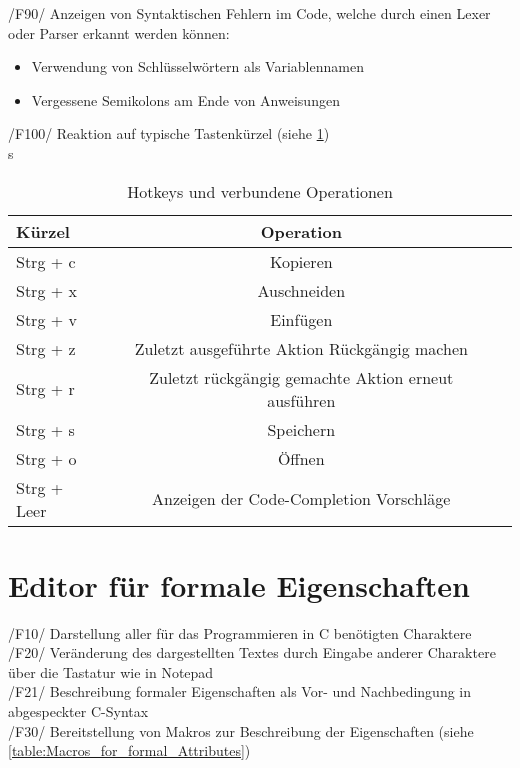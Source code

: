 \documentclass[a4paper]{scrreprt}
\begin{document}
/F90/ Anzeigen von Syntaktischen Fehlern im Code, welche durch einen Lexer oder Parser erkannt werden können: 
\begin{itemize}
\item Verwendung von Schlüsselwörtern als Variablennamen 
\item Vergessene Semikolons am Ende von Anweisungen
\end{itemize}
/F100/ Reaktion auf typische Tastenkürzel (siehe \ref{table:Hotkeys_and_operations})\\s
\begin{table}
\caption{Hotkeys und verbundene Operationen}
\begin{tabular}{lcr} 
Kürzel & Operation \\
\hline 
Strg + c & Kopieren \\
Strg + x & Auschneiden \\
Strg + v & Einfügen \\
Strg + z & Zuletzt ausgeführte Aktion Rückgängig machen \\
Strg + r & Zuletzt rückgängig gemachte Aktion erneut ausführen \\
Strg + s & Speichern \\
Strg + o & Öffnen \\
Strg + Leer & Anzeigen der Code-Completion Vorschläge\\
\end{tabular}
\label{table:Hotkeys_and_operations}
\end{table}

 
\section{Editor für formale Eigenschaften}
/F10/ Darstellung aller für das Programmieren in C benötigten Charaktere \\
/F20/ Veränderung des dargestellten Textes durch Eingabe anderer Charaktere über die  Tastatur wie in Notepad \\
/F21/ Beschreibung formaler Eigenschaften als Vor- und Nachbedingung in abgespeckter C-Syntax\\
/F30/ Bereitstellung von Makros zur Beschreibung der Eigenschaften (siehe \ref{table:Macros_for_formal_Attributes}) \\
\end{document}
